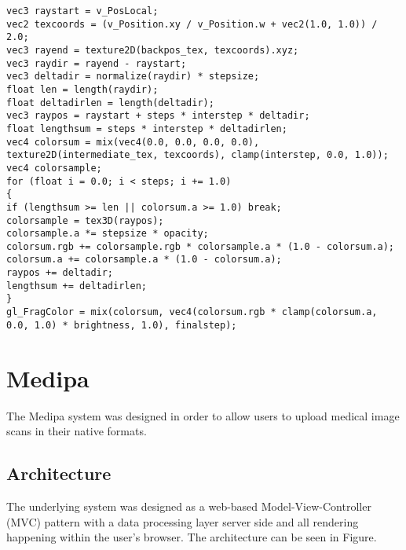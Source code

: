 \documentclass{acm_proc_article-sp}
\begin{document}
\begin{verbatim}
vec3 raystart = v_PosLocal;
vec2 texcoords = (v_Position.xy / v_Position.w + vec2(1.0, 1.0)) / 2.0;
vec3 rayend = texture2D(backpos_tex, texcoords).xyz;
vec3 raydir = rayend - raystart;
vec3 deltadir = normalize(raydir) * stepsize;
float len = length(raydir);
float deltadirlen = length(deltadir);
vec3 raypos = raystart + steps * interstep * deltadir;
float lengthsum = steps * interstep * deltadirlen;
vec4 colorsum = mix(vec4(0.0, 0.0, 0.0, 0.0), texture2D(intermediate_tex, texcoords), clamp(interstep, 0.0, 1.0));
vec4 colorsample;
for (float i = 0.0; i < steps; i += 1.0)
{
if (lengthsum >= len || colorsum.a >= 1.0) break;
colorsample = tex3D(raypos);
colorsample.a *= stepsize * opacity;
colorsum.rgb += colorsample.rgb * colorsample.a * (1.0 - colorsum.a);
colorsum.a += colorsample.a * (1.0 - colorsum.a);
raypos += deltadir;
lengthsum += deltadirlen;
}
gl_FragColor = mix(colorsum, vec4(colorsum.rgb * clamp(colorsum.a, 0.0, 1.0) * brightness, 1.0), finalstep);
\end{verbatim}

\section{Medipa}
The Medipa system was designed in order to allow users to upload medical image scans in their native formats.

\subsection{Architecture}
The underlying system was designed as a web-based Model-View-Controller (MVC) pattern with a data processing layer server side and all rendering happening within the user's browser.  The architecture can be seen in Figure.
\end{document}
